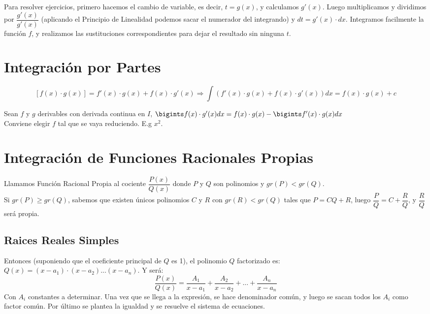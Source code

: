 \documentclass[11pt,a4paper]{article}
\begin{document}
Para resolver ejercicios, primero hacemos el cambio de variable, es decir, $t=g(x)$, y calculamos $g'(x)$. Luego multiplicamos y dividimos por $\dfrac{g'(x)}{g'(x)}$ (aplicando el Principio de Linealidad podemos sacar el numerador del integrando) y $dt = g'(x)\cdot dx$. Integramos facilmente la funci\'on $f$, y realizamos las sustituciones correspondientes para dejar el resultado sin ninguna $t$.

\section{Integraci\'on por Partes}
$$[f(x)\cdot g(x)] = f'(x)\cdot g(x) + f(x)\cdot g'(x) \Rightarrow \int (f'(x)\cdot g(x) + f(x)\cdot g'(x))dx = f(x)\cdot g(x)+c$$

Sean $f$ y $g$ derivables con derivada continua en $I$, $\bigints f(x)\cdot g'(x)dx = f(x)\cdot g(x) - \bigints f'(x)\cdot g(x) dx$\\

Conviene elegir $f$ tal que se vaya reduciendo. E.g $x^2$.

\section{Integraci\'on de Funciones Racionales Propias}
Llamamos Funci\'on Racional Propia al cociente $\dfrac{P(x)}{Q(x)}$ donde $P$ y $Q$ son polinomios y $gr(P)<gr(Q)$.\\

Si $gr(P)\geq gr(Q)$, sabemos que existen \'unicos polinomios $C$ y $R$ con $gr(R)<gr(Q)$ tales que $P=CQ+R$, luego $\dfrac{P}{Q} = C + \dfrac{R}{Q}$, y $\dfrac{R}{Q}$ ser\'a propia.

\subsection{Raices Reales Simples}
Entonces (suponiendo que el coeficiente principal de $Q$ es 1), el polinomio $Q$ factorizado es:\\ $Q(x)=(x-a_1)\cdot(x-a_2)...(x-a_n)$. Y ser\'a: $$\dfrac{P(x)}{Q(x)} = \dfrac{A_1}{x-a_1} + \dfrac{A_2}{x-a_2} + ... + \dfrac{A_n}{x-a_n}$$
Con $A_i$ constantes a determinar.
Una vez que se llega a la expresi\'on, se hace denominador com\'un, y luego se sacan todos los $A_i$ como factor com\'un. Por \'ultimo se plantea la igualdad y se resuelve el sistema de ecuaciones.

\newpage
\end{document}
